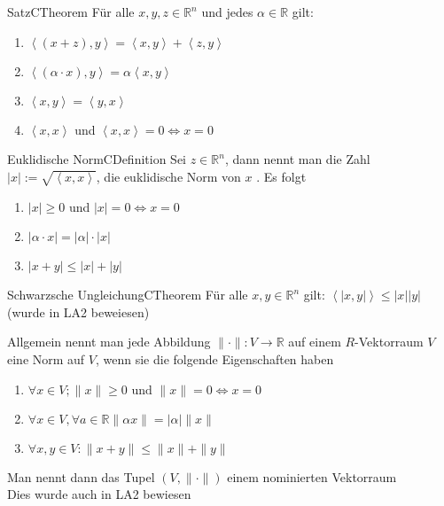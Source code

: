 \documentclass[11.5 pt, a4paper]{memoir}
\begin{document}
\begin{ibox}{Satz}{CTheorem}
    Für alle $ x, y, z \in \mathbb{R}^{n} $ und jedes $ \alpha \in  \mathbb{R} $ gilt:
    \begin{enumerate}[label=\alph*)]
        \item $ \left< \left( x + z \right) , y \right> = \left< x,y \right>
            + \left<z, y \right>$ 
        \item $ \left< \left( \alpha \cdot x \right), y \right> = \alpha
            \left< x, y \right>$ 
        \item $ \left< x, y \right> = \left< y,x \right> $ 
        \item $ \left<x,x \right>  $ und $ \left<x,x \right> = 0 \iff x = 0 $
    \end{enumerate}
\end{ibox}

\begin{ibox}{Euklidische Norm}{CDefinition}
   Sei $ z \in \mathbb{R}^n $, dann nennt man die Zahl $ \left| x \right| :=
   \sqrt{ \left<x,x \right>}$, die euklidische Norm von $ x $ . Es folgt 
   \begin{enumerate}[label=\alph*)]
       \item $ \left| x \right| \geq 0  $ und $ \left| x \right| = 0 \iff x = 0$
       \item $ \left| \alpha \cdot x \right|  = \left| \alpha \right| \cdot
           \left| x \right| $ 
       \item $ \left| x + y \right| \leq \left| x \right| + \left| y \right|  $ 
   \end{enumerate}
\end{ibox}

\begin{ibox}{Schwarzsche Ungleichung}{CTheorem}
    Für alle $ x, y \in \mathbb{R}^{n} $ gilt: $ \left< \left| x,y \right| \right>
    \leq \left| x \right| \left| y \right| $  
    \\ (wurde in LA2 beweiesen)
\end{ibox}
Allgemein nennt man jede Abbildung $ \| \cdot \| : V \to \mathbb{R} $ auf einem $
R $-Vektorraum $ V $ eine Norm auf $ V $, wenn sie die folgende Eigenschaften
haben
\begin{enumerate}[label=\alph*)]
    \item $ \forall x \in V; \| x \| \geq 0 \text{ und } \| x \|=0 \iff x=0 $ 
    \item $ \forall x \in V, \forall a \in \mathbb{R} \| \alpha x  \| =
        \left| \alpha \right| \|x \| $ 
	\item $ \forall x, y \in V : \| x+y \| \leq \|x \| + \|y \| $ 
\end{enumerate}
Man nennt dann das Tupel $ \left( V, \| \cdot \| \right)  $ einem nominierten
Vektorraum \\
Dies wurde auch in LA2 bewiesen
\end{document}

